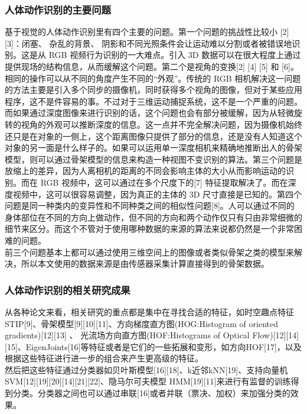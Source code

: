 \subsubsection{人体动作识别的主要问题}\label{ux4ebaux4f53ux52a8ux4f5cux8bc6ux522bux7684ux4e3bux8981ux95eeux9898}

基于视觉的人体动作识别里有四个主要的问题。第一个问题的挑战性比较小
{[}2{]} {[}3{]}：闭塞、 杂乱的背景、
阴影和不同光照条件会让运动难以分割或者被错误地识别。这是从 RGB
视频行为识别的一大难点。引入 3D
数据可以在很大程度上通过提供现场的结构信息，从而缓解这个问题。第二个是视角的变换{[}2{]}
{[}4{]} {[}5{]} 和
{[}6{]}。相同的操作可以从不同的角度产生不同的``外观''。传统的 RGB
相机解决这一问题的方法主要是引入多个同步的摄像机，同时获得多个视角的图像，但对于某些应用程序，这不是件容易的事。不过对于三维运动捕捉系统，这不是一个严重的问题。而如果通过深度图像来进行识别的话，这个问题也会有部分被缓解，因为从轻微旋转的视角的外观可以推断深度的信息。这一点并不完全解决问题，因为摄像机始终还只是在对象的一侧上，这个距离图像只提供了部分的信息，还是没有人知道这个对象的另一面是什么样子的。如果可以运用单一深度相机来精确地推断出人的骨架模型，则可以通过骨架模型的信息来构造一种视图不变识别的算法。第三个问题是放缩上的差异，因为人离相机的距离的不同会影响主体的大小从而影响运动的识别。而在
RGB 视频中，这可以通过在多个尺度下的{[}7{]}
特征提取解决了。而在深度视频中，这可以很容易调整，因为真正的主体的 3D
尺寸直接是已知的。第四个问题是同一种类内的变异性和不同种类之间的相似性问题{[}8{]}。人可以通过不同的身体部位在不同的方向上做动作，但不同的方向和两个动作仅只有只由非常细微的细节来区分。而这个不管对于使用哪种数据的来源的算法来说都仍然是一个非常困难的问题。\\前三个问题基本上都可以通过使用三维空间上的图像或者类似骨架之类的模型来解决，所以本文使用的数据来源是由传感器采集计算直接得到的骨架数据。

\subsubsection{人体动作识别的相关研究成果}\label{ux4ebaux4f53ux52a8ux4f5cux8bc6ux522bux7684ux76f8ux5173ux7814ux7a76ux6210ux679c}

从各种论文来看，相关研究的重点都是集中在寻找合适的特征，如时空趣点特征STIP{[}9{]}、骨架模型{[}9{]}{[}10{]}{[}11{]}、方向梯度直方图(HOG:Histogram
of oriented gradients){[}12{]}{[}13{]} 、
光流场方向直方图(HOF:Histograms of Optical
Flow){[}12{]}{[}14{]}{[}15{]}、EigenJoints{[}16{]}等特征或者是它们的一些拓展和变形，如方向HOF{[}17{]}，以及根据这些特征进行进一步的组合来产生更高级的特征。\\然后把这些特征通过分类器如贝叶斯模型{[}16{]}{[}18{]}、k近邻kNN{[}19{]}、支持向量机
SVM{[}12{]}{[}19{]}{[}20{]}{[}14{]}{[}21{]}{[}22{]}、隐马尔可夫模型
HMM{[}19{]}{[}11{]}来进行有监督的训练得到分类。分类器之间也可以通过串联{[}16{]}或者并联（票决、加权）来加强分类的效果。

